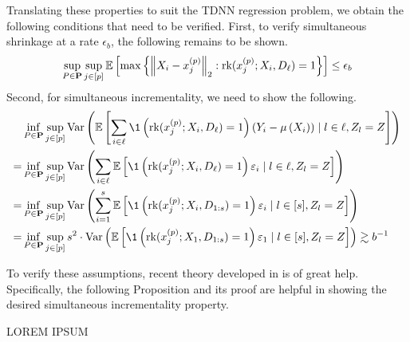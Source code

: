 Translating these properties to suit the TDNN regression problem, we obtain the following conditions that need to be verified.
First, to verify simultaneous shrinkage at a rate $\epsilon_b$, the following remains to be shown.
\begin{equation}
	\sup_{P \in \mathbf{P}} \sup_{j \in[p]}
	\mathbb{E}\left[\max \left\{\left\|X_{i}-x^{(p)}_{j}\right\|_{2}:
	\text{rk}(x^{(p)}_{j}; X_{i}, D_{\ell}) = 1\right\}\right]
	\leq \epsilon_b
\end{equation}
Second, for simultaneous incrementality, we need to show the following.
\begin{equation}
	\begin{aligned}
		  & \inf_{P \in \mathbf{P}} \sup_{j \in[p]}
		\Var\left(\E\left[
				\sum_{i \in \ell} \1\left(\rk(x^{(p)}_{j}; X_{i}, D_{\ell}) = 1\right) \left(Y_{i} - \mu\left(X_{i}\right)\right) \mid l \in \ell, Z_l = Z\right]
		\right)                                     \\
		= & \inf_{P \in \mathbf{P}} \sup_{j \in[p]}
		\Var\left(
		\sum_{i \in \ell}\E\left[\1\left(\rk(x^{(p)}_{j}; X_{i}, D_{\ell}) = 1\right) \varepsilon_i \mid l \in \ell, Z_l = Z\right]
		\right)                                     \\
		= & \inf_{P \in \mathbf{P}} \sup_{j \in[p]}
		\Var\left(
		\sum_{i = 1}^{s}\E\left[\1\left(\rk(x^{(p)}_{j}; X_{i}, D_{1:s}) = 1\right) \varepsilon_i \mid l \in [s], Z_l = Z\right]
		\right)                                     \\
		= & \inf_{P \in \mathbf{P}} \sup_{j \in[p]}
		s^2 \cdot \Var\left(
		\E\left[\1\left(\rk(x^{(p)}_{j}; X_1, D_{1:s}) = 1\right) \varepsilon_1 \mid l \in [s], Z_l = Z\right]
		\right)
		\gtrsim b^{-1}
	\end{aligned}
\end{equation}

To verify these assumptions, recent theory developed in \citet{peng_rates_2022} is of great help.
Specifically, the following Proposition and its proof are helpful in showing the desired simultaneous incrementality property.

	{\color{red} LOREM IPSUM}

